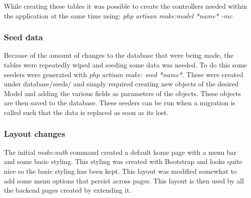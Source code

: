 While creating these tables it was possible to create the controllers needed within the application at the same time using: \textit{php artisan make:model *name* -mc } 
\subsubsection{Seed data}
Because of the amount of changes to the database that were being made, the tables were repeatedly wiped and seeding some data was needed. To do this some seeders were generated with \textit{php artisan make: seed *name*}. These were created under database/seeds/ and simply required creating new objects of the desired Model and adding the various fields as parameters of the objects. These objects are then saved to the database. These seeders can be run when a migration is called such that the data is replaced as soon as its lost.
\subsubsection{Layout changes}
The initial \textit{make:auth} command created a default home page with a menu bar and some basic styling. This styling was created with Bootstrap\cite{bootstrap} and looks quite nice so the basic styling has been kept. This layout was modified somewhat to add some menu options that persist across pages. This layout is then used by all the backend pages created by extending it.
\newpage
